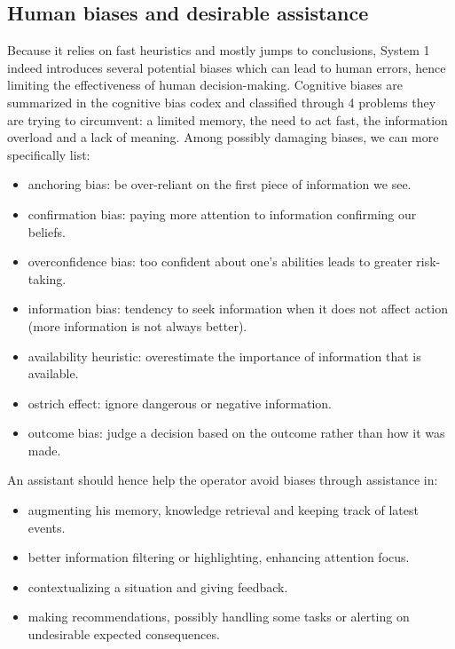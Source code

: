 \documentclass{IOS-Book-Article}
\begin{document}
\subsection{Human biases and desirable assistance}
\label{sec:human_biaises}

Because it relies on fast heuristics and mostly jumps to conclusions, System 1 indeed introduces several potential biases which can lead to human errors, hence limiting the effectiveness of human decision-making. Cognitive biases are summarized in the cognitive bias codex \cite{codex}
and classified through 4 problems they are trying to circumvent: a limited memory, the need to act fast, the information overload and a lack of meaning. Among possibly damaging biases, we can more specifically list:
\begin{itemize}
\item anchoring bias: be over-reliant on the first piece of information we see.
\item confirmation bias: paying more attention to information confirming our beliefs.
\item overconfidence bias: too confident about one's abilities leads to greater risk-taking.
\item information bias: tendency to seek information when it does not affect action (more information is not always better). 
\item availability heuristic: overestimate the importance of information that is available.  
\item ostrich effect: ignore dangerous or negative information. 
\item outcome bias: judge a decision based on the outcome rather than how it was made.
\end{itemize}

An assistant should hence help the operator avoid biases through assistance in:
\begin{itemize}
\item augmenting his memory, knowledge retrieval and keeping track of latest events.
\item better information filtering or highlighting, enhancing attention focus.
\item contextualizing a situation and giving feedback.
\item making recommendations, possibly handling some tasks or alerting on undesirable expected consequences.
\end{itemize}
\end{document}
